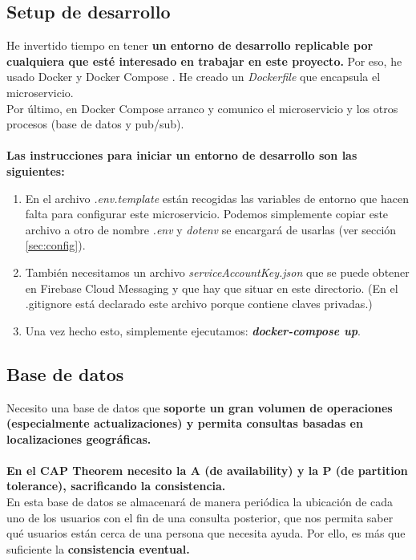\subsection{Setup de desarrollo}\label{sec:dev}

He invertido tiempo en tener \textbf{un entorno de desarrollo replicable por cualquiera que esté interesado en trabajar en este proyecto.}
Por eso, he usado Docker y Docker Compose \cite{docker}. He creado un \textit{Dockerfile} que encapsula el microservicio. 
\\ Por último, en Docker Compose arranco y comunico el microservicio y los otros procesos (base de datos y pub/sub). \\ \\
\textbf{Las instrucciones para iniciar un entorno de desarrollo son las siguientes:}

\begin{enumerate}
	\item En el archivo \textit{.env.template} están recogidas las variables de entorno que hacen falta para configurar este microservicio.
Podemos simplemente copiar este archivo a otro de nombre \textit{.env} y \textit{dotenv} se encargará de usarlas (ver sección \ref{sec:config}).
\item También necesitamos un archivo \textit{serviceAccountKey.json} que se puede obtener en Firebase Cloud Messaging \cite{firebase} y que hay que situar en este directorio. 
(En el .gitignore está declarado este archivo porque contiene claves privadas.)
\item Una vez hecho esto, simplemente ejecutamos: \textbf{\textit{docker-compose up}}.
\end{enumerate}

\subsection{Base de datos}

Necesito una base de datos que \textbf{soporte un gran volumen de operaciones (especialmente actualizaciones) y permita consultas basadas en localizaciones geográficas.} \\ \\
\textbf{En el CAP Theorem \cite{cap} necesito la A (de availability) y la P (de partition tolerance), sacrificando la consistencia.}
\\
En esta base de datos se almacenará de manera periódica la ubicación de cada uno de los usuarios con el fin de una consulta posterior, que nos permita saber qué usuarios
están cerca de una persona que necesita ayuda. Por ello, es más que suficiente la \textbf{consistencia eventual.}

